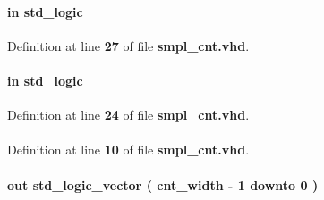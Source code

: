 \paragraph[{mimo\+\_\+en}]{ {\bfseries \textcolor{keywordflow}{in}\textcolor{vhdlchar}{ }} {\bfseries \textcolor{comment}{std\+\_\+logic}\textcolor{vhdlchar}{ }} \hspace{0.3cm}{\ttfamily [Port]}}\label{classsmpl__cnt_a0c57670aee4f9fbfa3c286573012965a}


Definition at line {\bf 27} of file {\bf smpl\+\_\+cnt.\+vhd}.

\paragraph[{mode}]{ {\bfseries \textcolor{keywordflow}{in}\textcolor{vhdlchar}{ }} {\bfseries \textcolor{comment}{std\+\_\+logic}\textcolor{vhdlchar}{ }} \hspace{0.3cm}{\ttfamily [Port]}}\label{classsmpl__cnt_a219fe733f94bce997e904a6e45b1ac19}


Definition at line {\bf 24} of file {\bf smpl\+\_\+cnt.\+vhd}.

\paragraph[{numeric\+\_\+std}]{\hspace{0.3cm}{\ttfamily [Package]}}\label{classsmpl__cnt_a2edc34402b573437d5f25fa90ba4013e}


Definition at line {\bf 10} of file {\bf smpl\+\_\+cnt.\+vhd}.

\paragraph[{q}]{ {\bfseries \textcolor{keywordflow}{out}\textcolor{vhdlchar}{ }} {\bfseries \textcolor{comment}{std\+\_\+logic\+\_\+vector}\textcolor{vhdlchar}{ }\textcolor{vhdlchar}{(}\textcolor{vhdlchar}{ }\textcolor{vhdlchar}{ }\textcolor{vhdlchar}{ }\textcolor{vhdlchar}{ }{\bfseries {\bf cnt\+\_\+width}} \textcolor{vhdlchar}{-\/}\textcolor{vhdlchar}{ } \textcolor{vhdldigit}{1} \textcolor{vhdlchar}{ }\textcolor{keywordflow}{downto}\textcolor{vhdlchar}{ }\textcolor{vhdlchar}{ } \textcolor{vhdldigit}{0} \textcolor{vhdlchar}{ }\textcolor{vhdlchar}{)}\textcolor{vhdlchar}{ }} \hspace{0.3cm}{\ttfamily [Port]}}\label{classsmpl__cnt_a3e050efc7868047c6797edbdfb677d4a}


